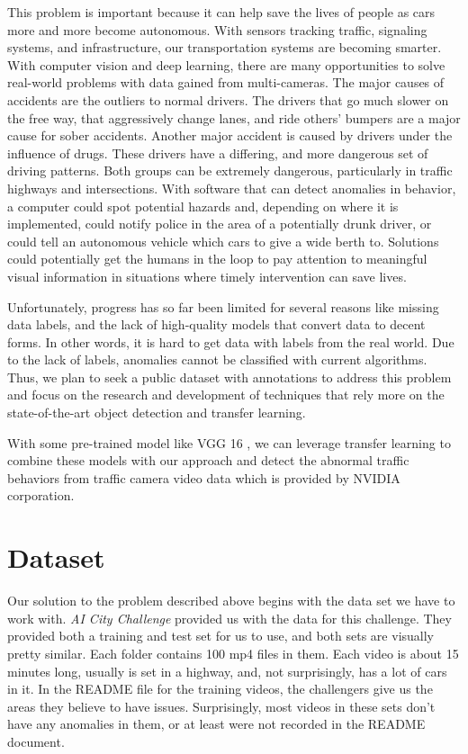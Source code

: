 \documentclass[10pt,twocolumn,letterpaper]{article}
\begin{document}
This problem is important because it can help save the lives of people as cars more and more become autonomous. With sensors tracking traffic, signaling systems, and infrastructure, our transportation systems are becoming smarter. With computer vision and deep learning, there are many opportunities to solve real-world problems with data gained from multi-cameras. The major causes of accidents are the outliers to normal drivers. The drivers that go much slower on the free way, that aggressively change lanes, and ride others' bumpers are a major cause for sober accidents. Another major accident is caused by drivers under the influence of drugs. These drivers have a differing, and more dangerous set of driving patterns. Both groups can be extremely dangerous, particularly in traffic highways and intersections. With software that can detect anomalies in behavior, a computer could spot potential hazards and, depending on where it is implemented, could notify police in the area of a potentially drunk driver, or could tell an autonomous vehicle which cars to give a wide berth to. Solutions could potentially get the humans in the loop to pay attention to meaningful visual information in situations where timely intervention can save lives.\cite{naphade2017nvidia}

Unfortunately, progress has so far been limited for several reasons like missing data labels, and the lack of high-quality models that convert data to decent forms. In other words, it is hard to get data with labels from the real world. Due to the lack of labels, anomalies cannot be classified with current algorithms. Thus, we plan to seek a public dataset with annotations to address this problem and focus on the research and development of techniques that rely more on the state-of-the-art object detection and transfer learning.

With some pre-trained model like VGG 16 \cite{ren2015faster}, we can leverage transfer learning to combine these models with our approach and detect the abnormal traffic behaviors from traffic camera video data which is provided by NVIDIA corporation.

\section{Dataset}

Our solution to the problem described above begins with the data set we have to work with. \textit{AI City Challenge} provided us with the data for this challenge. They provided both a training and test set for us to use, and both sets are visually pretty similar. Each folder contains 100 mp4 files in them. Each video is about 15 minutes long, usually is set in a highway, and, not surprisingly, has a lot of cars in it. In the README file for the training videos, the challengers give us the areas they believe to have issues. Surprisingly, most videos in these sets don't have any anomalies in them, or at least were not recorded in the README document. 
\end{document}
